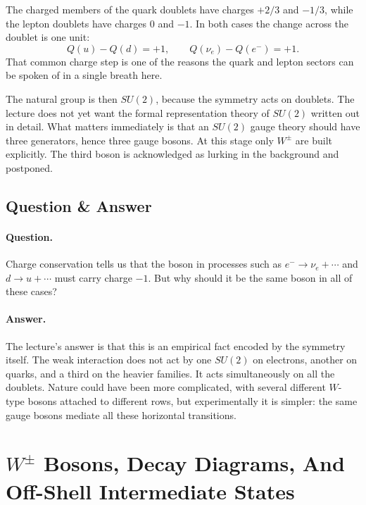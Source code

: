 The charged members of the quark doublets have charges \(+2/3\) and \(-1/3\), while the lepton doublets have charges \(0\) and \(-1\). In both cases the change across the doublet is one unit:
\begin{equation}
Q(u)-Q(d)=+1,
\qquad
Q(\nu_e)-Q(e^-)=+1.
\end{equation}
That common charge step is one of the reasons the quark and lepton sectors can be spoken of in a single breath here.

The natural group is then \(SU(2)\), because the symmetry acts on doublets. The lecture does not yet want the formal representation theory of \(SU(2)\) written out in detail. What matters immediately is that an \(SU(2)\) gauge theory should have three generators, hence three gauge bosons. At this stage only \(W^\pm\) are built explicitly. The third boson is acknowledged as lurking in the background and postponed.

\subsection{Question \& Answer}

\paragraph{Question.} Charge conservation tells us that the boson in processes such as \(e^-\to\nu_e+\cdots\) and \(d\to u+\cdots\) must carry charge \(-1\). But why should it be the same boson in all of these cases?

\paragraph{Answer.} The lecture's answer is that this is an empirical fact encoded by the symmetry itself. The weak interaction does not act by one \(SU(2)\) on electrons, another on quarks, and a third on the heavier families. It acts simultaneously on all the doublets. Nature could have been more complicated, with several different \(W\)-type bosons attached to different rows, but experimentally it is simpler: the same gauge bosons mediate all these horizontal transitions.

\section{\(W^\pm\) Bosons, Decay Diagrams, And Off-Shell Intermediate States}

